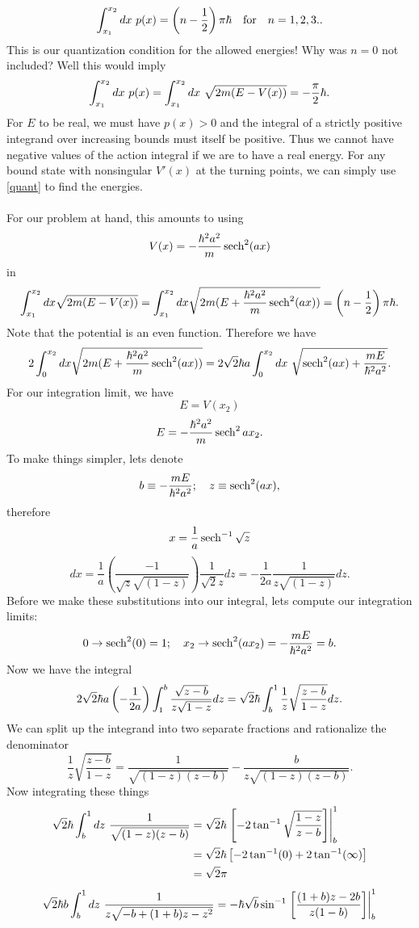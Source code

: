 \documentclass[11pt,letterpaper]{article}
\begin{document}
\begin{enumerate}
\begin{enumerate}
\begin{equation}\label{quant}\int_{x_1}^{x_2}{dx\ p(x)} = \left(n-\frac{1}{2}\right)\pi\hbar\quad\text{for}\quad n=1,2,3..\end{equation}
This is our quantization condition for the allowed energies! Why was $n=0$ not included? Well this would imply 
$$\int_{x_1}^{x_2}{dx\ p(x)} = \int_{x_1}^{x_2}{dx\ \sqrt{2m(E-V(x))}} = -\frac{\pi}{2}\h.$$
For $E$ to be real, we must have $p(x)>0$ and the integral of a strictly positive integrand over increasing bounds must itself be positive. Thus we cannot have negative values of the action integral if we are to have a real energy. For any bound state with nonsingular $V'(x)$ at the turning points, we can simply use \eqref{quant} to find the energies. 
\\ \\For our problem at hand, this amounts to using 
$$V(x) = -\frac{\hbar^2a^2}{m}\operatorname{sech}^2(ax)$$
in
$$\int_{x_1}^{x_2}{dx \sqrt{2m(E-V(x))}} = \int_{x_1}^{x_2}{dx \sqrt{2m(E+\frac{\hbar^2a^2}{m}\operatorname{sech}^2(ax))}} = \left(n-\frac{1}{2}\right)\pi\hbar.$$
Note that the potential is an even function. Therefore we have
$$2\int_0^{x_2}{dx \sqrt{2m(E+\frac{\hbar^2a^2}{m}\operatorname{sech}^2(ax))}}  =2\sqrt2\hbar a\int_0^{x_2}{dx\ \sqrt{\operatorname{sech}^2(ax)+\frac{mE}{\hbar^2a^2}}}. $$
For our integration limit, we have
$$E=V(x_2)$$
$$E = -\frac{\hbar^2a^2}{m}\operatorname{sech}^2{ax_2}.$$
To make things simpler, lets denote
$$b\equiv -\frac{mE}{\hbar^2a^2};\quad z\equiv\operatorname{sech}^2(ax),$$
therefore 
$$x=\frac{1}{a}\operatorname{sech}^{-1}\sqrt z$$
$$dx = \frac{1}{a}\left(\frac{-1}{\sqrt z\sqrt{(1-z)}}\right)\frac{1}{\sqrt 2z}dz=-\frac{1}{2a}\frac{1}{z\sqrt{(1-z)}}dz .$$
Before we make these substitutions into our integral, lets compute our integration limits:
$$0\to\operatorname{sech}^2(0) = 1;\quad x_2\to\operatorname{sech}^2(ax_2) = -\frac{mE}{\hbar^2a^2} = b.$$
Now we have the integral
$$2\sqrt2\hbar a\left(-\frac{1}{2a}\right)\int_1^b{\frac{\sqrt{z-b}}{z\sqrt{1-z}}dz}  = \sqrt 2\hbar\int_b^1{\frac{1}{z}\sqrt{\frac{z-b}{1-z}}dz}.$$
We can split up the integrand into two separate fractions and rationalize the denominator
$$\frac{1}{z}\sqrt{\frac{z-b}{1-z}} = \frac{1}{\sqrt{(1-z)(z-b)}}-\frac{b}{z\sqrt{(1-z)(z-b)}}.$$
Now integrating these things
\begin{align*}\sqrt2 \hbar\int_b^1{dz\ \frac{1}{\sqrt{(1-z)(z-b)}}} &= \sqrt2\hbar\left.\left[-2\tan^{-1}\sqrt{\frac{1-z}{z-b}}\right]\right|_b^1\\
&=\sqrt2\hbar\left[-2\tan^{-1}(0)+2\tan^{-1}(\infty)\right] \\
&= \sqrt 2\pi
\end{align*}
\begin{align*}\-\sqrt 2\h b\int_b^1{dz\ \frac{1}{z\sqrt{-b+(1+b)z-z^2}}} &= -\h\sqrt b\sin^{-1}\left.\left[\frac{(1+b)z-2b}{z(1-b)}\right]\right|_b^1\\

\end{align*}
\end{enumerate}
\end{enumerate}
\end{document}
